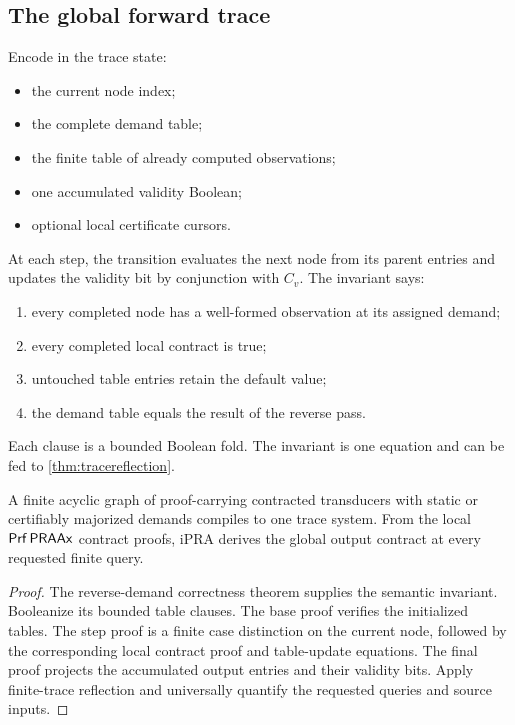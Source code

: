\subsection{The global forward trace}

Encode in the trace state:
\begin{itemize}
\item the current node index;
\item the complete demand table;
\item the finite table of already computed observations;
\item one accumulated validity Boolean;
\item optional local certificate cursors.
\end{itemize}
At each step, the transition evaluates the next node from its parent entries
and updates the validity bit by conjunction with \(C_v\).  The invariant says:
\begin{enumerate}
\item every completed node has a well-formed observation at its assigned
demand;
\item every completed local contract is true;
\item untouched table entries retain the default value;
\item the demand table equals the result of the reverse pass.
\end{enumerate}
Each clause is a bounded Boolean fold.  The invariant is one equation and can
be fed to \cref{thm:tracereflection}.

\begin{theorem}
A finite acyclic graph of proof-carrying contracted transducers with static or
certifiably majorized demands compiles to one trace system.  From the local
\(\mathsf{Prf}\,\mathsf{PRAAx}\) contract proofs, iPRA derives the global output contract at
every requested finite query.
\end{theorem}

\begin{proof}
The reverse-demand correctness theorem supplies the semantic invariant.
Booleanize its bounded table clauses.  The base proof verifies the initialized
tables.  The step proof is a finite case distinction on the current node,
followed by the corresponding local contract proof and table-update equations.
The final proof projects the accumulated output entries and their validity
bits.  Apply finite-trace reflection and universally quantify the requested
queries and source inputs.
\end{proof}

